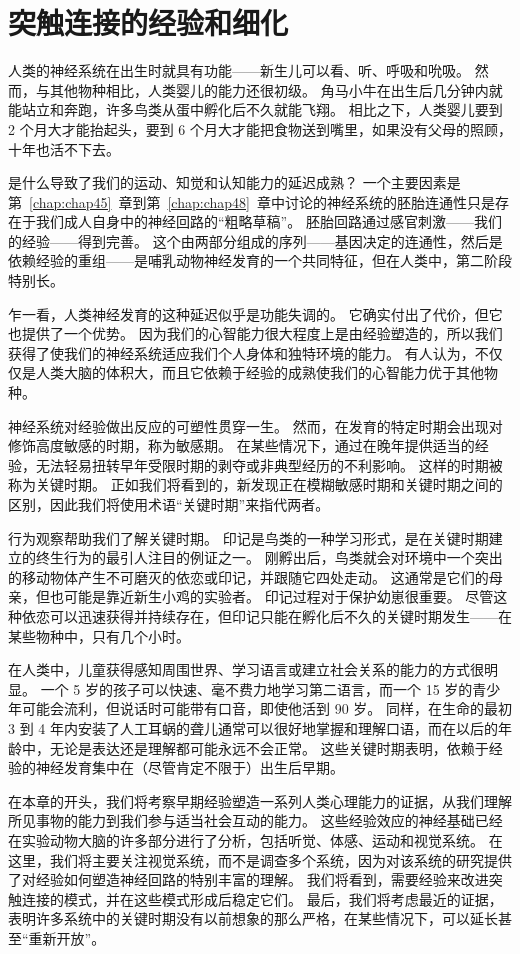 \chapter{突触连接的经验和细化} \label{chap:chap49}


人类的神经系统在出生时就具有功能——新生儿可以看、听、呼吸和吮吸。
然而，与其他物种相比，人类婴儿的能力还很初级。
角马小牛在出生后几分钟内就能站立和奔跑，许多鸟类从蛋中孵化后不久就能飞翔。
相比之下，人类婴儿要到 2 个月大才能抬起头，要到 6 个月大才能把食物送到嘴里，如果没有父母的照顾，十年也活不下去。


是什么导致了我们的运动、知觉和认知能力的延迟成熟？
一个主要因素是第~\ref{chap:chap45}~章到第~\ref{chap:chap48}~章中讨论的神经系统的胚胎连通性只是存在于我们成人自身中的神经回路的“粗略草稿”。
胚胎回路通过感官刺激——我们的经验——得到完善。
这个由两部分组成的序列——基因决定的连通性，然后是依赖经验的重组——是哺乳动物神经发育的一个共同特征，但在人类中，第二阶段特别长。


乍一看，人类神经发育的这种延迟似乎是功能失调的。
它确实付出了代价，但它也提供了一个优势。
因为我们的心智能力很大程度上是由经验塑造的，所以我们获得了使我们的神经系统适应我们个人身体和独特环境的能力。
有人认为，不仅仅是人类大脑的体积大，而且它依赖于经验的成熟使我们的心智能力优于其他物种。


神经系统对经验做出反应的可塑性贯穿一生。
然而，在发育的特定时期会出现对修饰高度敏感的时期，称为敏感期。
在某些情况下，通过在晚年提供适当的经验，无法轻易扭转早年受限时期的剥夺或非典型经历的不利影响。
这样的时期被称为关键时期。
正如我们将看到的，新发现正在模糊敏感时期和关键时期之间的区别，因此我们将使用术语“关键时期”来指代两者。


行为观察帮助我们了解关键时期。
印记是鸟类的一种学习形式，是在关键时期建立的终生行为的最引人注目的例证之一。
刚孵出后，鸟类就会对环境中一个突出的移动物体产生不可磨灭的依恋或印记，并跟随它四处走动。
这通常是它们的母亲，但也可能是靠近新生小鸡的实验者。 印记过程对于保护幼崽很重要。
尽管这种依恋可以迅速获得并持续存在，但印记只能在孵化后不久的关键时期发生——在某些物种中，只有几个小时。


在人类中，儿童获得感知周围世界、学习语言或建立社会关系的能力的方式很明显。
一个 5 岁的孩子可以快速、毫不费力地学习第二语言，而一个 15 岁的青少年可能会流利，但说话时可能带有口音，即使他活到 90 岁。
同样，在生命的最初 3 到 4 年内安装了人工耳蜗的聋儿通常可以很好地掌握和理解口语，而在以后的年龄中，无论是表达还是理解都可能永远不会正常。
这些关键时期表明，依赖于经验的神经发育集中在（尽管肯定不限于）出生后早期。


在本章的开头，我们将考察早期经验塑造一系列人类心理能力的证据，从我们理解所见事物的能力到我们参与适当社会互动的能力。
这些经验效应的神经基础已经在实验动物大脑的许多部分进行了分析，包括听觉、体感、运动和视觉系统。
在这里，我们将主要关注视觉系统，而不是调查多个系统，因为对该系统的研究提供了对经验如何塑造神经回路的特别丰富的理解。
我们将看到，需要经验来改进突触连接的模式，并在这些模式形成后稳定它们。
最后，我们将考虑最近的证据，表明许多系统中的关键时期没有以前想象的那么严格，在某些情况下，可以延长甚至“重新开放”。


